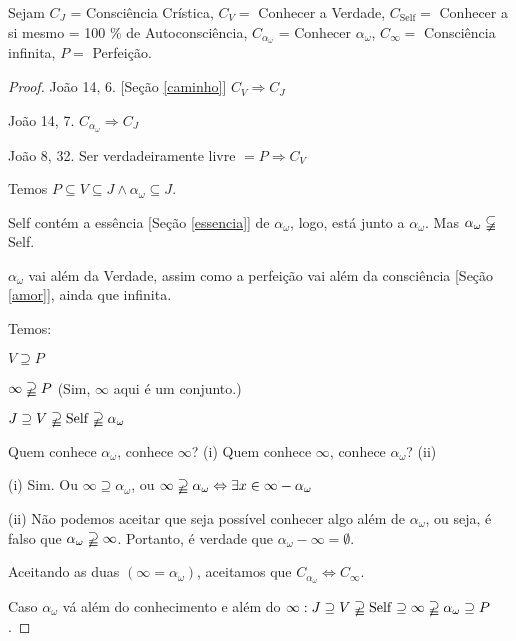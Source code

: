 \documentclass[12pt,a4paper]{article}
\begin{document}
			Sejam
			$C_J$ = Consci\^encia Cr\'istica,
			$C_V = $ Conhecer a Verdade,
			$ C_{\mathrm{Self}} = $ Conhecer a si mesmo = 100 \% de Autoconsci\^encia,
			$ C_{\alpha_\omega} $ = Conhecer $ \alpha_\omega $,
			$C_\infty =$ Consci\^encia infinita,
			$P = $ Perfei\c{c}\~ao.


			\begin{proof}
			Jo\~ao 14, 6. [Se\c{c}\~ao \ref{caminho}] $C_V \Rightarrow C_J $

			Jo\~ao\cite{unidade} 14, 7. $C_{\alpha_\omega} \Rightarrow C_J $

			Jo\~ao\cite{verdade} 8, 32. Ser verdadeiramente livre $ = P \Rightarrow C_V $

			Temos $ P \subseteq V \subseteq J \wedge \alpha_\omega \subseteq J$.

			Self cont\'em a ess\^encia [Se\c{c}\~ao \ref{essencia}] de $\alpha_\omega$, logo, est\'a junto a $\alpha_\omega$. Mas $\alpha_\omega \varsubsetneqq $ Self.

			$ \alpha_\omega $ vai al\'em da Verdade, assim como a perfei\c{c}\~ao vai al\'em da consci\^encia [Se\c{c}\~ao \ref{amor}], ainda que infinita.

			Temos:

			$ V \supseteq P $

			$ \infty \varsupsetneqq P $ (Sim, $ \infty $ aqui \'e um conjunto.)

			$ J \supseteq V \varsupsetneqq \mathrm{Self} \varsupsetneqq \alpha_\omega $

			Quem conhece $ \alpha_\omega $, conhece $ \infty $? (i) Quem conhece $ \infty $, conhece $ \alpha_\omega $? (ii)

			(i) Sim. Ou $ \infty \supseteq \alpha_\omega $, ou $ \infty \varsupsetneqq \alpha_\omega \Leftrightarrow \exists x \in \infty - \alpha_\omega $

			(ii) N\~ao podemos aceitar que seja poss\'ivel conhecer algo al\'em de $ \alpha_\omega $, ou seja, \'e falso que $ \alpha_\omega \varsupsetneqq \infty $. Portanto, \'e verdade que $ \alpha_\omega - \infty = \emptyset $.

			Aceitando as duas $(\infty = \alpha_\omega)$, aceitamos que $C_{\alpha_\omega} \Leftrightarrow C_\infty $.

			Caso $ \alpha_\omega $ v\'a al\'em do conhecimento e al\'em do $ \infty: J \supseteq V \varsupsetneqq \mathrm{Self} \supseteq \infty \varsupsetneqq \alpha_\omega \supseteq P$.
			\end{proof}
\end{document}
